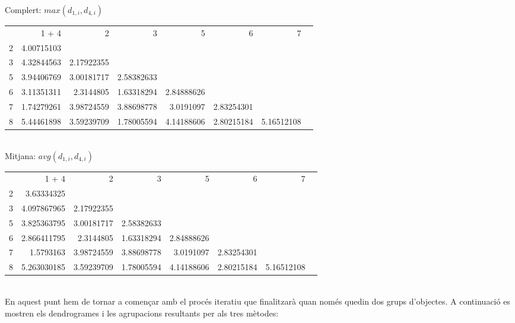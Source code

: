 \documentclass{article} %
\begin{document}
{	Complert: \(max(d_{1,i}, d_{4,i})\)


	{\selectfont\small
	\begin{tabular}{r r r r r r r r}
		  & 1 + 4      & 2          & 3          & 5          & 6          & 7          \\
		2 & 4.00715103 &            &            &            &            &            \\
		3 & 4.32844563 & 2.17922355 &            &            &            &            \\
		5 & 3.94406769 & 3.00181717 & 2.58382633 &            &            &            \\
		6 & 3.11351311 & 2.3144805  & 1.63318294 & 2.84888626 &            &            \\
		7 & 1.74279261 & 3.98724559 & 3.88698778 & 3.0191097  & 2.83254301 &            \\
		8 & 5.44461898 & 3.59239709 & 1.78005594 & 4.14188606 & 2.80215184 & 5.16512108 \\
	\end{tabular}
	} \\

	Mitjana: \(avg(d_{1,i}, d_{4,i})\)


	{\selectfont\small
	\begin{tabular}{r r r r r r r r}
		  & 1 + 4      & 2          & 3          & 5          & 6          & 7          \\
		2 & 3.63334325 &            &            &            &            &            \\
		3 & 4.097867965 & 2.17922355 &            &            &            &            \\
		5 & 3.825363795 & 3.00181717 & 2.58382633 &            &            &            \\
		6 & 2.866411795 & 2.3144805  & 1.63318294 & 2.84888626 &            &            \\
		7 & 1.5793163 & 3.98724559 & 3.88698778 & 3.0191097  & 2.83254301 &            \\
		8 & 5.263030185 & 3.59239709 & 1.78005594 & 4.14188606 & 2.80215184 & 5.16512108 \\
	\end{tabular}
	} \\

	En aquest punt hem de tornar a començar amb el procés iteratiu que finalitzarà quan només quedin dos grups d’objectes. A continuació es mostren els dendrogrames i les agrupacions resultants per als tres mètodes: \\

}
\end{document}
